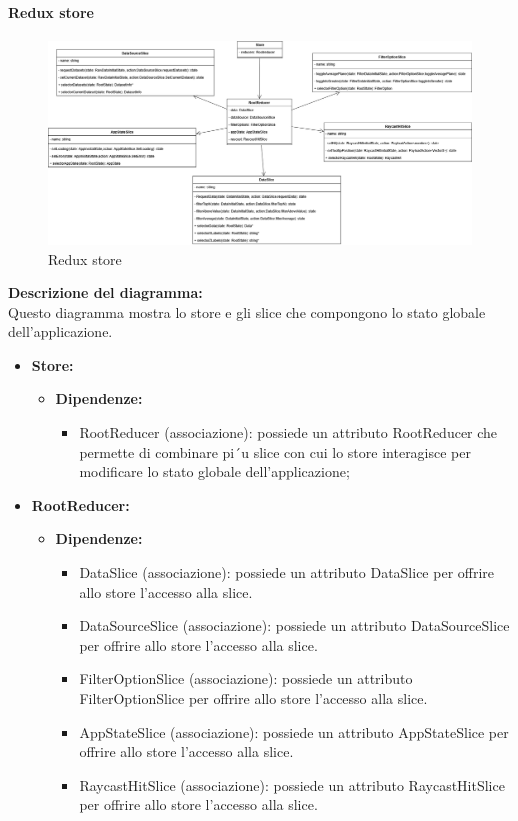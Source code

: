 \paragraph{Redux store}
\begin{figure}[h!] \centering
    \includegraphics[scale=0.3]{template/images/uml_front/logic/store.png}
    \caption{Redux store}
\end{figure}
\textbf{Descrizione del diagramma:}\\
Questo diagramma mostra lo store e gli slice che compongono lo stato globale dell'applicazione.
\begin{itemize}
    \item \textbf{Store:}
    \begin{itemize}
        \item \textbf{Dipendenze:}
        \begin{itemize}
            \item RootReducer (associazione): possiede un attributo RootReducer che permette di combinare pi´u slice
            con cui lo store interagisce per modificare lo stato globale dell’applicazione;
        \end{itemize}  
    \end{itemize}

    \item \textbf{RootReducer:}
    \begin{itemize}
        \item \textbf{Dipendenze:}
        \begin{itemize}
            \item DataSlice (associazione): possiede un attributo DataSlice per offrire allo store l’accesso alla slice.
            \item DataSourceSlice (associazione): possiede un attributo DataSourceSlice per offrire allo store l’accesso alla slice.
            \item FilterOptionSlice (associazione): possiede un attributo FilterOptionSlice per offrire allo store l’accesso alla slice.
            \item AppStateSlice (associazione): possiede un attributo AppStateSlice per offrire allo store l’accesso alla slice.
            \item RaycastHitSlice (associazione): possiede un attributo RaycastHitSlice per offrire allo store l’accesso alla slice.
        \end{itemize}  
    \end{itemize}
\end{itemize}


